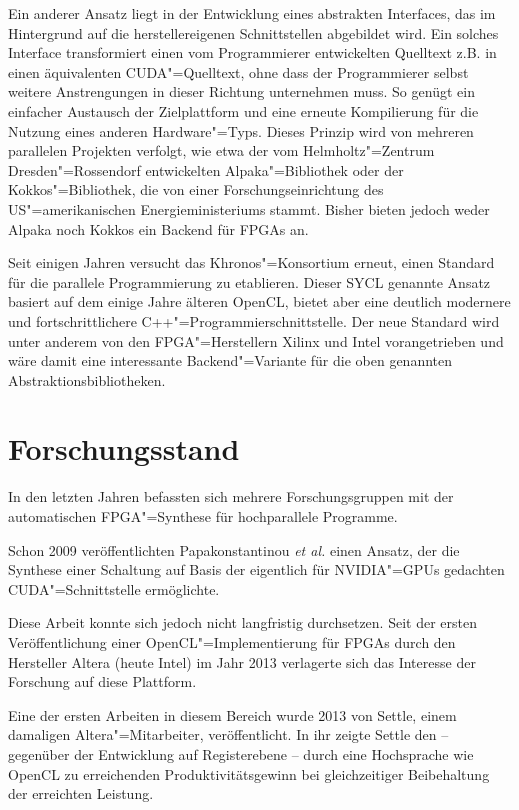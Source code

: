 Ein anderer Ansatz liegt in der Entwicklung eines abstrakten Interfaces, das im
Hintergrund auf die herstellereigenen Schnittstellen abgebildet wird. Ein
solches Interface transformiert einen vom Programmierer entwickelten Quelltext
z.B. in einen äquivalenten CUDA"=Quelltext, ohne dass der Programmierer selbst
weitere Anstrengungen in dieser Richtung unternehmen muss. So genügt ein
einfacher Austausch der Zielplattform und eine erneute Kompilierung für die
Nutzung eines anderen Hardware"=Typs. Dieses Prinzip wird von mehreren
parallelen Projekten verfolgt, wie etwa der vom Helmholtz"=Zentrum
Dresden"=Rossendorf entwickelten Alpaka"=Bibliothek oder der Kokkos"=Bibliothek,
die von einer Forschungseinrichtung des US"=amerikanischen Energieministeriums
stammt. Bisher bieten jedoch weder Alpaka noch Kokkos ein Backend für FPGAs an.

Seit einigen Jahren versucht das Khronos"=Konsortium erneut, einen Standard für
die parallele Programmierung zu etablieren. Dieser SYCL genannte Ansatz basiert
auf dem einige Jahre älteren OpenCL, bietet aber eine deutlich modernere und
fortschrittlichere C++"=Programmierschnittstelle. Der neue Standard wird unter
anderem von den FPGA"=Herstellern Xilinx und Intel vorangetrieben und wäre damit
eine interessante Backend"=Variante für die oben genannten
Abstraktionsbibliotheken.

\section{Forschungsstand}\label{einleitung:forschung}

In den letzten Jahren befassten sich mehrere Forschungsgruppen mit der
automatischen \mbox{FPGA}"=Synthese für hochparallele Programme.

Schon 2009 veröffentlichten Papakonstantinou \textit{et al.} einen Ansatz, der
die Synthese einer Schaltung auf Basis der eigentlich für NVIDIA"=GPUs gedachten
CUDA"=Schnittstelle ermöglichte. \cite[vgl.][]{papakonstantinou2009} 

Diese Arbeit konnte sich jedoch nicht langfristig durchsetzen. Seit der ersten
Veröffentlichung einer OpenCL"=Implementierung für FPGAs durch den Hersteller
Altera (heute Intel) im Jahr 2013 verlagerte sich das Interesse der Forschung
auf diese Plattform. 

Eine der ersten Arbeiten in diesem Bereich wurde 2013 von Settle, einem
damaligen Altera"=Mitarbeiter, veröffentlicht. In ihr zeigte Settle den
-- gegenüber der Entwicklung auf Registerebene -- durch eine Hochsprache wie
OpenCL zu erreichenden Produktivitätsgewinn bei gleichzeitiger Beibehaltung der
erreichten Leistung. \cite[vgl.][]{settle2013}

